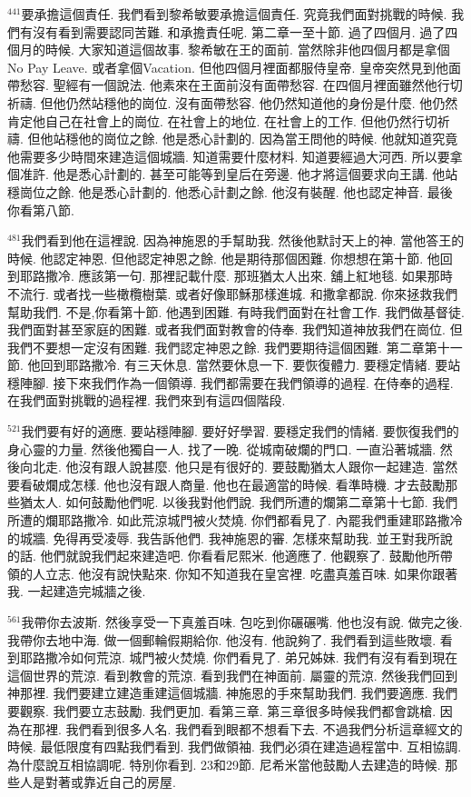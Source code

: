 \documentclass{book}
\begin{document}
$^{441}$要承擔這個責任.
我們看到黎希敏要承擔這個責任.
究竟我們面對挑戰的時候.
我們有沒有看到需要認同苦難.
和承擔責任呢.
第二章一至十節.
過了四個月.
過了四個月的時候.
大家知道這個故事.
黎希敏在王的面前.
當然除非他四個月都是拿個No Pay Leave.
或者拿個Vacation.
但他四個月裡面都服侍皇帝.
皇帝突然見到他面帶愁容.
聖經有一個說法.
他素來在王面前沒有面帶愁容.
在四個月裡面雖然他行切祈禱.
但他仍然站穩他的崗位.
沒有面帶愁容.
他仍然知道他的身份是什麼.
他仍然肯定他自己在社會上的崗位.
在社會上的地位.
在社會上的工作.
但他仍然行切祈禱.
但他站穩他的崗位之餘.
他是悉心計劃的.
因為當王問他的時候.
他就知道究竟他需要多少時間來建造這個城牆.
知道需要什麼材料.
知道要經過大河西.
所以要拿個准許.
他是悉心計劃的.
甚至可能等到皇后在旁邊.
他才將這個要求向王講.
他站穩崗位之餘.
他是悉心計劃的.
他悉心計劃之餘.
他沒有裝醒.
他也認定神音.
最後你看第八節.

$^{481}$我們看到他在這裡說.
因為神施恩的手幫助我.
然後他默討天上的神.
當他答王的時候.
他認定神恩.
但他認定神恩之餘.
他是期待那個困難.
你想想在第十節.
他回到耶路撒冷.
應該第一句.
那裡記載什麼.
那班猶太人出來.
舖上紅地毯.
如果那時不流行.
或者找一些橄欖樹葉.
或者好像耶穌那樣進城.
和撒拿都說.
你來拯救我們幫助我們.
不是,你看第十節.
他遇到困難.
有時我們面對在社會工作.
我們做基督徒.
我們面對甚至家庭的困難.
或者我們面對教會的侍奉.
我們知道神放我們在崗位.
但我們不要想一定沒有困難.
我們認定神恩之餘.
我們要期待這個困難.
第二章第十一節.
他回到耶路撒冷.
有三天休息.
當然要休息一下.
要恢復體力.
要穩定情緒.
要站穩陣腳.
接下來我們作為一個領導.
我們都需要在我們領導的過程.
在侍奉的過程.
在我們面對挑戰的過程裡.
我們來到有這四個階段.

$^{521}$我們要有好的適應.
要站穩陣腳.
要好好學習.
要穩定我們的情緒.
要恢復我們的身心靈的力量.
然後他獨自一人.
找了一晚.
從城南破爛的門口.
一直沿著城牆.
然後向北走.
他沒有跟人說甚麼.
他只是有很好的.
要鼓勵猶太人跟你一起建造.
當然要看破爛成怎樣.
他也沒有跟人商量.
他也在最適當的時候.
看準時機.
才去鼓勵那些猶太人.
如何鼓勵他們呢.
以後我對他們說.
我們所遭的爛第二章第十七節.
我們所遭的爛耶路撒冷.
如此荒涼城門被火焚燒.
你們都看見了.
內罷我們重建耶路撒冷的城牆.
免得再受凌辱.
我告訴他們.
我神施恩的審.
怎樣來幫助我.
並王對我所說的話.
他們就說我們起來建造吧.
你看看尼熙米.
他適應了.
他觀察了.
鼓勵他所帶領的人立志.
他沒有說快點來.
你知不知道我在皇宮裡.
吃盡真羞百味.
如果你跟著我.
一起建造完城牆之後.

$^{561}$我帶你去波斯.
然後享受一下真羞百味.
包吃到你碾碾嘴.
他也沒有說.
做完之後.
我帶你去地中海.
做一個郵輪假期給你.
他沒有.
他說夠了.
我們看到這些敗壞.
看到耶路撒冷如何荒涼.
城門被火焚燒.
你們看見了.
弟兄姊妹.
我們有沒有看到現在這個世界的荒涼.
看到教會的荒涼.
看到我們在神面前.
屬靈的荒涼.
然後我們回到神那裡.
我們要建立建造重建這個城牆.
神施恩的手來幫助我們.
我們要適應.
我們要觀察.
我們要立志鼓勵.
我們更加.
看第三章.
第三章很多時候我們都會跳槍.
因為在那裡.
我們看到很多人名.
我們看到眼都不想看下去.
不過我們分析這章經文的時候.
最低限度有四點我們看到.
我們做領袖.
我們必須在建造過程當中.
互相協調.
為什麼說互相協調呢.
特別你看到.
23和29節.
尼希米當他鼓勵人去建造的時候.
那些人是對著或靠近自己的房屋.
\end{document}
